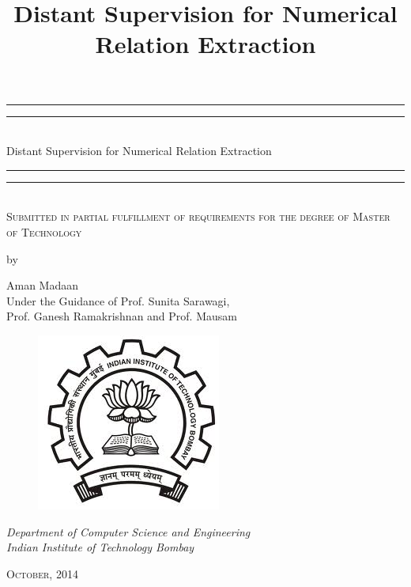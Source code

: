 \documentclass[a4paper,10pt]{article}
\title{Distant Supervision for Numerical Relation Extraction} %
\begin{document}
\begin{titlepage}
    \centering
    \vspace*{\baselineskip}
    \rule{\textwidth}{1.6pt}\vspace*{-\baselineskip}\vspace*{2pt}
    \rule{\textwidth}{0.4pt}\\[\baselineskip]
    {\LARGE \color{blue} Distant Supervision for Numerical Relation Extraction}\\[0.2\baselineskip]
    \rule{ \textwidth}{0.4pt}\vspace*{-\baselineskip}\vspace{3.2pt}
    \rule{\textwidth}{1.6pt}\\[\baselineskip]
    \scshape
    Submitted in partial fulfillment of requirements for the degree of
    Master of Technology \par
    \vspace*{1\baselineskip}
     by \\[\baselineskip]
    {\large  Aman Madaan \vspace*{1\baselineskip} \\ Under the Guidance of Prof. Sunita Sarawagi,\\ Prof. Ganesh Ramakrishnan and Prof. Mausam\par}
       \begin{figure}[h]
 \centering
 \vspace*{13\baselineskip}
 \includegraphics[bb=0 0 229 220,scale=0.35]{./iitb_logo.jpg}
\end{figure}

    {\vspace*{1\baselineskip}  \itshape Department of Computer Science and Engineering \\ Indian Institute of Technology Bombay\par}
    \vfill
 
    {\scshape October, 2014} \\
    {\large }\par
  \end{titlepage}
\end{document}
